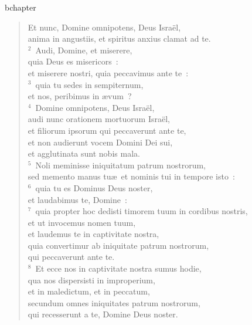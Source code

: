 bchapter\begin{verse}\vspace{-19pt}Et nunc, Domine omnipotens, Deus Isra\"el,\\ anima in angustiis, et spiritus anxius clamat ad te.\\
${}^{2}$~Audi, Domine, et miserere,\\ quia Deus es misericors~:\\ et miserere nostri, quia peccavimus ante te~:\\
${}^{3}$~quia tu sedes in sempiternum,\\ et nos, peribimus in \ae vum~?\\
${}^{4}$~Domine omnipotens, Deus Isra\"el,\\ audi nunc orationem mortuorum Isra\"el,\\ et filiorum ipsorum qui peccaverunt ante te,\\ et non audierunt vocem Domini Dei sui,\\ et agglutinata sunt nobis mala.\\
${}^{5}$~Noli meminisse iniquitatum patrum nostrorum,\\ sed memento manus tu\ae\ et nominis tui in tempore isto~:\\
${}^{6}$~quia tu es Dominus Deus noster,\\ et laudabimus te, Domine~:\\
${}^{7}$~quia propter hoc dedisti timorem tuum in cordibus nostris,\\ et ut invocemus nomen tuum,\\ et laudemus te in captivitate nostra,\\ quia convertimur ab iniquitate patrum nostrorum,\\ qui peccaverunt ante te.\\
${}^{8}$~Et ecce nos in captivitate nostra sumus hodie,\\ qua nos dispersisti in improperium,\\ et in maledictum, et in peccatum,\\ secundum omnes iniquitates patrum nostrorum,\\ qui recesserunt a te, Domine Deus noster.\end{verse}



